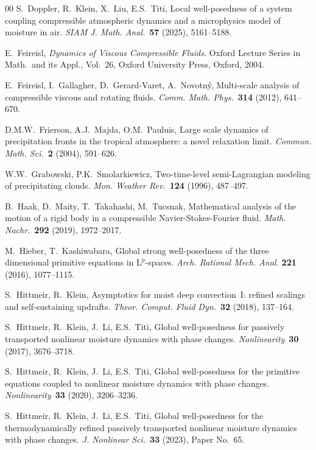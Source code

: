 \documentclass[10pt]{amsart}
\theoremstyle{plain}
\theoremstyle{definition}
\theoremstyle{thm}
\numberwithin{equation}{section}
\newcommand{\rL}{\mathrm{L}}
\begin{document}
\begin{thebibliography}{00}
S.~Doppler, R.~Klein, X.~Liu, E.S.~Titi,
Local well-posedness of a system coupling compressible atmospheric dynamics and a microphysics model of moisture in air.
{\it SIAM J. Math. Anal.}~{\bf 57} (2025), 5161--5188.

E.~Feireisl,
{\it Dynamics of Viscous Compressible Fluids}. Oxford Lecture Series in Math.~and its Appl., Vol.~26, Oxford University Press, Oxford, 2004.

E.~Feireisl, I.~Gallagher, D.~Gerard-Varet, A.~Novotn\'y,
Multi-scale analysis of compressible viscous and rotating fluids.
{\it Comm. Math. Phys.}~{\bf 314} (2012), 641--670.

D.M.W.~Frierson, A.J.~Majda, O.M.~Pauluis,
Large scale dynamics of precipitation fronts in the tropical atmosphere: a novel relaxation limit.
{\it Commun. Math. Sci.}~{\bf 2} (2004), 591--626.

W.W.~Grabowski, P.K.~Smolarkiewicz, 
Two-time-level semi-Lagrangian modeling of precipitating clouds.
{\it Mon. Weather Rev.}~{\bf 124} (1996), 487--497.

B.~Haak, D.~Maity, T.~Takahashi, M.~Tucsnak, 
Mathematical analysis of the motion of a rigid body in a compressible Navier-Stokes-Fourier fluid.
{\it Math. Nachr.}~{\bf 292} (2019), 1972--2017.

M.~Hieber, T.~Kashiwabara,
Global strong well-posedness of the three dimensional primitive equations in $\rL^p$-spaces.
{\it Arch. Rational Mech. Anal.} {\bf 221} (2016), 1077--1115. 

S.~Hittmeir, R.~Klein, 
Asymptotics for moist deep convection~I: refined scalings and self-sustaining updrafts.
{\it Theor. Comput. Fluid Dyn.}~{\bf 32} (2018), 137--164.

S.~Hittmeir, R.~Klein, J.~Li, E.S.~Titi,
Global well-posedness for passively transported nonlinear moisture dynamics with phase changes.
{\it Nonlinearity}~{\bf 30} (2017), 3676--3718.

S.~Hittmeir, R.~Klein, J.~Li, E.S.~Titi,
Global well-posedness for the primitive equations coupled to nonlinear moisture dynamics with phase changes.
{\it Nonlinearity}~{\bf 33} (2020), 3206--3236.

S.~Hittmeir, R.~Klein, J.~Li, E.S.~Titi, 
Global well-posedness for the thermodynamically refined passively transported nonlinear moisture dynamics with phase changes.
{\it J. Nonlinear Sci.}~{\bf 33} (2023), Paper No.~65.


\end{thebibliography}
\end{document}
